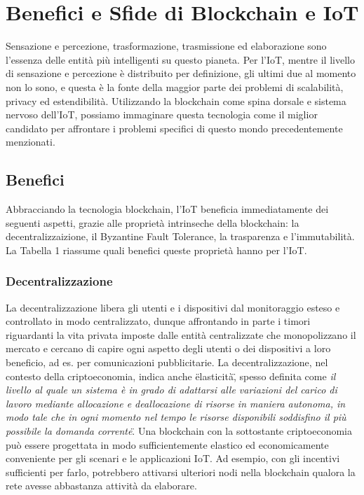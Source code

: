 \section{Benefici e Sfide di Blockchain e IoT}
Sensazione e percezione, trasformazione, trasmissione ed elaborazione sono l'essenza delle entità più intelligenti su questo pianeta. Per l'IoT, mentre il livello di sensazione e percezione è distribuito per definizione, gli ultimi due al momento non lo sono, e questa è la fonte della maggior parte dei problemi di scalabilità, privacy ed estendibilità. Utilizzando la blockchain come spina dorsale e sistema nervoso dell'IoT, possiamo immaginare questa tecnologia come il miglior candidato per affrontare i problemi specifici di questo mondo precedentemente menzionati.

\subsection{Benefici}
Abbracciando la tecnologia blockchain, l'IoT beneficia immediatamente dei seguenti aspetti, grazie alle proprietà intrinseche della blockchain: la decentralizzaizione, il Byzantine Fault Tolerance, la trasparenza e l'immutabilità. La Tabella 1 riassume quali benefici queste proprietà hanno per l'IoT.


\subsubsection{Decentralizzazione}
La decentralizzazione libera gli utenti e i dispositivi dal monitoraggio esteso e controllato in modo centralizzato, dunque affrontando in parte i timori riguardanti la vita privata imposte dalle entità centralizzate che monopolizzano il mercato e cercano di capire ogni aspetto degli utenti o dei dispositivi a loro beneficio, ad es. per comunicazioni pubblicitarie. La decentralizzazione, nel contesto della criptoeconomia, indica anche \"elasticità\", spesso definita come \"\emph{il livello al quale un sistema è in grado di adattarsi alle variazioni del carico di lavoro mediante allocazione e deallocazione di risorse in maniera autonoma, in modo tale che in ogni momento nel tempo le risorse disponibili soddisfino il più possibile la domanda corrente}\". Una blockchain con la sottostante criptoeconomia può essere progettata in modo sufficientemente elastico ed economicamente conveniente per gli scenari e le applicazioni IoT. Ad esempio, con gli  incentivi sufficienti per farlo, potrebbero attivarsi ulteriori nodi nella blockchain qualora la rete avesse abbastanza attività da elaborare.

